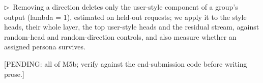 \documentclass[11pt]{article}
\newcommand{\flow}[1]{\par\noindent\textcolor{blue!60!black}{\small$\triangleright$\ #1}\par\medskip}
\newcommand{\pending}[1]{\par\noindent\textcolor{orange!80!black}{\small[PENDING: #1]}\par\medskip}
\begin{document}
\flow{Removing a direction deletes only the user-style component of a group's output (lambda = 1), estimated on held-out requests; we apply it to the style heads, their whole layer, the top user-style heads and the residual stream, against random-head and random-direction controls, and also measure whether an assigned persona survives.}
\pending{all of M5b; verify against the end-submission code before writing prose.}
\end{document}
